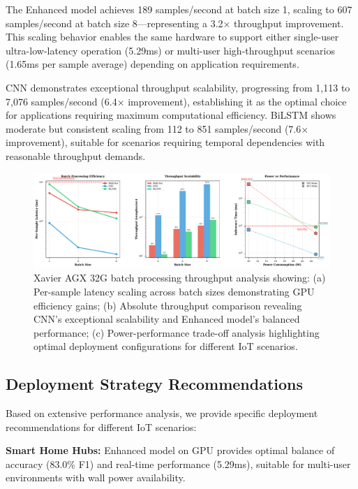 \documentclass[lettersize,journal]{IEEEtran}
\begin{document}
The Enhanced model achieves 189 samples/second at batch size 1, scaling to 607 samples/second at batch size 8—representing a 3.2× throughput improvement. This scaling behavior enables the same hardware to support either single-user ultra-low-latency operation (5.29ms) or multi-user high-throughput scenarios (1.65ms per sample average) depending on application requirements.

CNN demonstrates exceptional throughput scalability, progressing from 1,113 to 7,076 samples/second (6.4× improvement), establishing it as the optimal choice for applications requiring maximum computational efficiency. BiLSTM shows moderate but consistent scaling from 112 to 851 samples/second (7.6× improvement), suitable for scenarios requiring temporal dependencies with reasonable throughput demands.

\begin{figure}[t]
\centering
\includegraphics[width=\linewidth]{plots/fig8_xavier_throughput_analysis_v3.pdf}
\caption{Xavier AGX 32G batch processing throughput analysis showing: (a) Per-sample latency scaling across batch sizes demonstrating GPU efficiency gains; (b) Absolute throughput comparison revealing CNN's exceptional scalability and Enhanced model's balanced performance; (c) Power-performance trade-off analysis highlighting optimal deployment configurations for different IoT scenarios.}
\label{fig:xavier_throughput_analysis}
\end{figure}

\subsection{Deployment Strategy Recommendations}

Based on extensive performance analysis, we provide specific deployment recommendations for different IoT scenarios:

\textbf{Smart Home Hubs:} Enhanced model on GPU provides optimal balance of accuracy (83.0\% F1) and real-time performance (5.29ms), suitable for multi-user environments with wall power availability.
\end{document}
